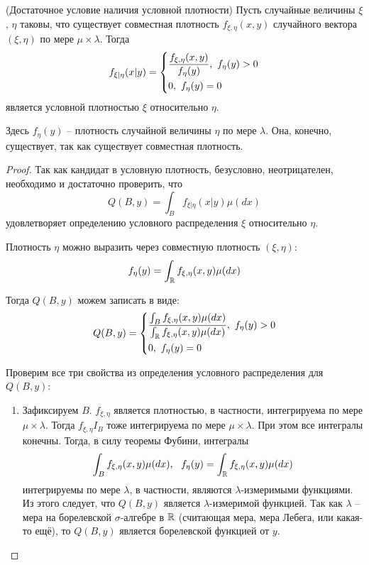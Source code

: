 \begin{theorem} (Достаточное условие наличия условной плотности)
    Пусть случайные величины $\xi$, $\eta$ таковы, что существует совместная плотность $f_{\xi, \eta}(x, y)$ случайного вектора $(\xi, \eta)$ по мере $\mu \times \lambda$. Тогда
    \[
        f_{\xi | \eta}(x | y) = \left\{\begin{aligned}
            & \frac{f_{\xi, \eta}(x, y)}{f_\eta(y)},\ f_\eta(y) > 0
            \\
            & 0,\ f_\eta(y) = 0
        \end{aligned}\right.
    \]
    является условной плотностью $\xi$ относительно $\eta$.

    Здесь $f_\eta(y)$ -- плотность случайной величины $\eta$ по мере $\lambda$. Она, конечно, существует, так как существует совместная плотность.
\end{theorem}

\begin{proof}
    Так как кандидат в условную плотность, безусловно, неотрицателен, необходимо и достаточно проверить, что
    \[
        Q(B, y) = \int_B f_{\xi | \eta}(x | y) \mu(dx)
    \]
    удовлетворяет определению условного распределения $\xi$ относительно $\eta$.

    Плотность $\eta$ можно выразить через совместную плотность $(\xi, \eta)$:
    \[
        f_\eta(y) = \int_{\mathbb{R}} f_{\xi, \eta}(x, y) \mu(dx)
    \]
    
    Тогда $Q(B, y)$ можем записать в виде:
    \[
        Q(B, y) = \left\{\begin{aligned}
            & \frac{\int_B f_{\xi, \eta}(x, y) \mu(dx)}{\int_{\mathbb{R}} f_{\xi, \eta}(x, y) \mu(dx)},\  f_\eta(y) > 0
            \\
            & 0,\ f_\eta(y) = 0
        \end{aligned}\right.
    \]

    Проверим все три свойства из определения условного распределения для $Q(B, y)$:
    \begin{enumerate}
        \item Зафиксируем $B$. $f_{\xi, \eta}$ является плотностью, в частности, интегрируема по мере $\mu \times \lambda$. Тогда $f_{\xi, \eta} I_B$ тоже интегрируема по мере $\mu \times \lambda$. При этом все интегралы конечны. Тогда, в силу теоремы Фубини, интегралы
        \[
            \int_B f_{\xi, \eta}(x, y) \mu(dx),\ \ f_\eta(y) = \int_\R f_{\xi, \eta}(x, y) \mu(dx)
        \]
        интегрируемы по мере $\lambda$, в частности, являются $\lambda$-измеримыми функциями. Из этого следует, что $Q(B, y)$ является $\lambda$-измеримой функцией. Так как $\lambda$ -- мера на борелевской $\sigma$-алгебре в $\mathbb{R}$ (считающая мера, мера Лебега, или какая-то ещё), то $Q(B, y)$ является борелевской функцией от $y$.


\end{enumerate}
\end{proof}

